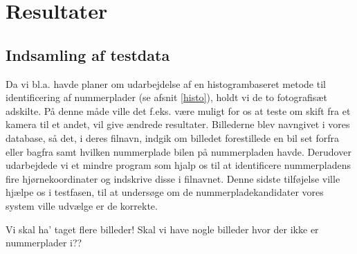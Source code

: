 \section{Resultater}

\subsection{Indsamling af testdata}







Da vi bl.a. havde planer om udarbejdelse af en histogrambaseret metode til identificering af nummerplader (se afsnit \ref{histo}), holdt vi de to fotografisæt adskilte. På denne måde ville det f.eks. være muligt for os at teste om skift fra et kamera til et andet, vil give ændrede resultater. Billederne blev navngivet i vores database, så det, i deres filnavn, indgik om billedet forestillede en bil set forfra eller bagfra samt hvilken nummerplade bilen på nummerpladen havde. Derudover udarbejdede vi et mindre program som hjalp os til at identificere nummerpladens fire hjørnekoordinater og indskrive disse i filnavnet. Denne sidste tilføjelse ville hjælpe os i testfasen, til at undersøge om de nummerpladekandidater vores system ville udvælge er de korrekte.
 
Vi skal ha' taget flere billeder! Skal vi have nogle billeder hvor der ikke er nummerplader i??



